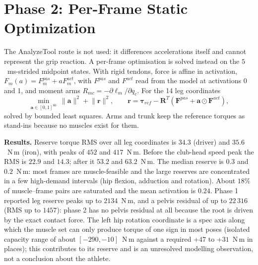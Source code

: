 \documentclass[11pt,a4paper]{article}
\begin{document}
\section{Phase 2: Per-Frame Static Optimization}
The AnalyzeTool route is not used: it differences accelerations itself and cannot represent the grip reaction. A per-frame optimisation is solved instead on the $5$~ms-strided midpoint states. With rigid tendons, force is affine in activation, $F_m(a)=F^{pas}_m+aF^{act}_m$, with $F^{pas}$ and $F^{act}$ read from the model at activations 0 and 1, and moment arms $R_{mc}=-\partial\ell_m/\partial q_c$. For the 14 leg coordinates
\[
\min_{\mathbf{a}\in[0,1]^{80}}\ \lVert\mathbf{a}\rVert^2+\lVert\mathbf{r}\rVert^2,\qquad
\mathbf{r}=\boldsymbol\tau_{ref}-\mathbf{R}^{T}\!\left(\mathbf{F}^{pas}+\mathbf{a}\odot\mathbf{F}^{act}\right),
\]
solved by bounded least squares. Arms and trunk keep the reference torques as stand-ins because no muscles exist for them.

\textbf{Results.} Reserve torque RMS over all leg coordinates is $34.3$ (driver) and $35.6$~N\,m (iron), with peaks of $452$ and $417$~N\,m. Before the club-head speed peak the RMS is $22.9$ and $14.3$; after it $53.2$ and $63.2$~N\,m. The median reserve is $0.3$ and $0.2$~N\,m: most frames are muscle-feasible and the large reserves are concentrated in a few high-demand intervals (hip flexion, adduction and rotation). About $18$\% of muscle--frame pairs are saturated and the mean activation is $0.24$. Phase 1 reported leg reserve peaks up to $2134$~N\,m, and a pelvis residual of up to $22\,316$ (RMS up to $1457$): phase 2 has no pelvis residual at all because the root is driven by the exact contact force. The left hip rotation coordinate is a spec axis along which the muscle set can only produce torque of one sign in most poses (isolated capacity range of about $[-290,-10]$~N\,m against a required $+47$ to $+31$~N\,m in places); this contributes to its reserve and is an unresolved modelling observation, not a conclusion about the athlete.
\end{document}
